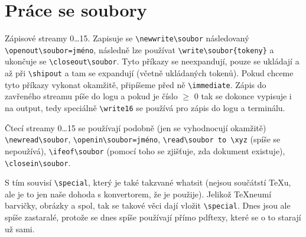 \documentclass[12pt]{article}					%
\begin{document}
\section{Práce se soubory}
    \begin{definice}[Streamy]
        Zápisové streamy 0…15. Zapisuje se \verb|\newwrite\soubor| následovaný \verb|\openout\soubor=jméno|, následně lze používat \verb|\write\soubor{tokeny}| a ukončuje se \verb|\closeout\soubor|. Tyto příkazy se neexpandují, pouze se ukládají a až při \verb|\shipout| a tam se expandují (včetně ukládaných tokenů). Pokud chceme tyto příkazy vykonat okamžitě, připíšeme před ně \verb|\immediate|. Zápis do zavřeného streamu píše do logu a pokud je číslo $≥$ 0 tak se dokonce vypisuje i na output, tedy speciálně \verb|\write16| se používá pro zápis do logu a terminálu.

        Čtecí streamy 0…15 se používají podobně (jen se vyhodnocují okamžitě) \verb|\newread\soubor|, \verb|\openin\soubor=jméno|, \verb|\read\soubor to \xyz| (spíše se nepoužívá), \verb|\ifeof\soubor| (pomocí toho se zjišťuje, zda dokument existuje), \verb|\closein\soubor|.
    \end{definice}

    \begin{definice}[Special]
        S tím souvisí \verb|\special|, který je také takzvané whatsit (nejsou součátstí TeXu, ale je to jen naše dohoda s konvertorem, že je použije). Jelikož \TeX neumí barvičky, obrázky a spol, tak se takové věci dají vložit \verb|\special|. Dnes jsou ale spíše zastaralé, protože se dnes spíše používají přímo pdftexy, které se o to starají už sami.
    \end{definice}
\end{document}

